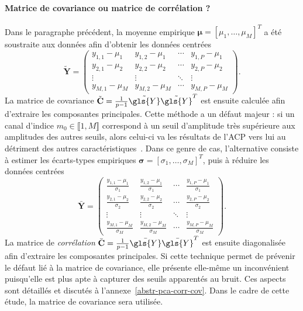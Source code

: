     \paragraph{Matrice de covariance ou matrice de corrélation ?} Dans le paragraphe précédent, la moyenne empirique $\boldsymbol\mu = [\mu_1,\dots,\mu_M]^T$ a été soustraite aux données afin d'obtenir les données centrées
    \begin{equation}
     \tilde{\mathbf{Y}} =
        \begin{pmatrix}
        y_{1,1} - \mu_1&y_{1,2} - \mu_1&\cdots&y_{1,P} - \mu_1\\
        y_{2,1} - \mu_2&y_{2,2} - \mu_2&\cdots&y_{2,P} - \mu_2\\
        \vdots&\vdots&\ddots&\vdots\\
        y_{M,1} - \mu_M&y_{M,2} - \mu_M&\cdots&y_{M,P} - \mu_M
        \end{pmatrix}.
    \end{equation}
    La matrice de covariance $\tilde{\mathbf{C}} = \frac{1}{p-1}\tilde{\gls{Y}}\tilde{\gls{Y}}^T$ est ensuite calculée afin d'extraire les composantes principales. Cette méthode a un défaut majeur : si un canal d'indice $m_0\in\llbracket 1,M\rrbracket$ correspond à un seuil d'amplitude très supérieure aux amplitudes des autres seuils, alors celui-ci va  les résultats de l'ACP vers lui au détriment des autres caractéristiques~\cite[Section~3.3]{jolliffe2002springer}.
    Dans ce genre de cas, l'alternative consiste à estimer les écarts-types empiriques $\boldsymbol\sigma=[\sigma_1,\dots,\sigma_M]^T$, puis à réduire les données centrées
    \begin{equation}
    \bar{\mathbf{Y}} =
    \begin{pmatrix}
    \frac{y_{1,1} - \mu_1}{\sigma_1}&
    \frac{y_{1,2} - \mu_1}{\sigma_1}&
    \cdots&
    \frac{y_{1,P} - \mu_1}{\sigma_1}\\
    \frac{y_{2,1} - \mu_2}{\sigma_2}&
    \frac{y_{2,2} - \mu_2}{\sigma_2}&
    \cdots&
    \frac{y_{2,P} - \mu_2}{\sigma_2}\\
    \vdots&\vdots&\ddots&\vdots\\
    \frac{y_{M,1} - \mu_M}{\sigma_M}&
    \frac{y_{M,2} - \mu_M}{\sigma_M}&
    \cdots&
    \frac{y_{M,P} - \mu_M}{\sigma_M}
    \end{pmatrix}.
    \end{equation}
    La matrice de \emph{corrélation} $\bar{\mathbf{C}} = \frac{1}{p-1}\bar{\gls{Y}}\bar{\gls{Y}}^T$ est ensuite diagonalisée afin d'extraire les composantes principales. %
    Si cette technique permet de prévenir le défaut lié à la matrice de covariance, elle présente elle-même un inconvénient puisqu'elle est plus apte à capturer des seuils apparentés au bruit.
    Ces aspects sont détaillés et discutés à l'annexe~\ref{abstr-pca-corr-cov}. Dans le cadre de cette étude, la matrice de covariance sera utilisée.


